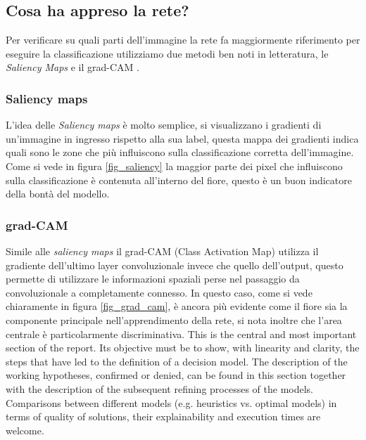 \subsection{Cosa ha appreso la rete?}
Per verificare su quali parti dell'immagine la rete fa maggiormente riferimento per eseguire la classificazione utilizziamo due metodi ben noti in letteratura, le \textit{Saliency Maps} \cite{simonyan2013deep} e il grad-CAM \cite{Selvaraju_2019}.
\subsubsection{Saliency maps}
L'idea delle \textit{Saliency maps} è molto semplice, si visualizzano i gradienti di un'immagine in ingresso rispetto alla sua label, questa mappa dei gradienti indica quali sono le zone che più influiscono sulla classificazione corretta dell'immagine.
Come si vede in figura \ref{fig_saliency} la maggior parte dei pixel che influiscono sulla classificazione è contenuta all'interno del fiore, questo è un buon indicatore della bontà del modello.
\subsubsection{grad-CAM}
Simile alle \textit{saliency maps} il grad-CAM (Class Activation Map) utilizza il gradiente dell'ultimo layer convoluzionale invece che quello dell'output, questo permette di utilizzare le informazioni spaziali perse nel passaggio da convoluzionale a completamente connesso.
In questo caso, come si vede chiaramente in figura \ref{fig_grad_cam}, è ancora più evidente come il fiore sia la componente principale nell'apprendimento della rete, si nota inoltre che l'area centrale è particolarmente discriminativa.
This is the central and most important section of the report. Its objective must be to show, with linearity and clarity, the steps that have led to the definition of a decision model. The description of the working hypotheses, confirmed or denied, can be found in this section together with the description of the subsequent refining processes of the models. Comparisons between different models (e.g. heuristics vs. optimal models) in terms of quality of solutions, their explainability and execution times are welcome. 

